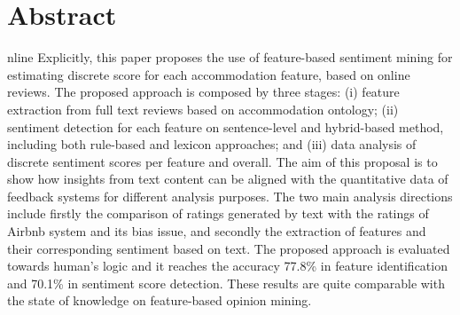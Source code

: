 %
%
%
\let\cleardoublepage\clearpage
\chapter{Abstract}
\begin{SingleSpace}

nline {\color{red}{reviews are an important source for both customers, to obtaining information before making purchase decisions, and businesses to improve the quality of their services. Opinion mining is an active field of research that makes use of Natural Language Processing (NLP) techniques for mining the huge amount of online text reviews. This paper aims to enhance the focus on customers by analyzing their opinions and aligning the results with the quantitative feedback received. The setting of this research is the dataset of Airbnb reviews, a giant online marketplace for vacation rentals. }} Explicitly, 
this paper proposes the use of feature-based sentiment mining for estimating discrete score for each accommodation feature, based on online reviews. The proposed approach is composed by three stages: (i) feature extraction from full text reviews based on accommodation ontology; (ii) sentiment detection for each feature on sentence-level and hybrid-based method, including both rule-based and lexicon approaches; and (iii) data analysis of discrete sentiment scores per feature and overall. The aim of this proposal is to show how insights from text content can be aligned with the quantitative data of feedback systems for different analysis purposes. The two main analysis directions include firstly the comparison of ratings generated by text with the ratings of Airbnb system and its bias issue, and secondly the extraction of features and their corresponding sentiment based on text. The proposed approach is evaluated towards human's logic and it reaches the accuracy 77.8\% in feature identification and 70.1\% in sentiment score detection. These results are quite comparable with the state of knowledge on feature-based opinion mining.
\end{SingleSpace}
\clearpage